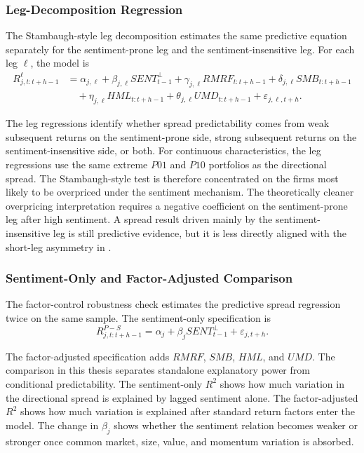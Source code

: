 \documentclass[11pt]{article}
\newcommand{\var}[1]{\ensuremath{#1}}
\begin{document}
\subsubsection{Leg-Decomposition Regression}
The Stambaugh-style leg decomposition estimates the same predictive equation separately for the sentiment-prone leg and the sentiment-insensitive leg. For each leg \var{\ell}, the model is
\begin{equation}
    \begin{aligned}
    R^{\ell}_{j,t:t+h-1}
    &=
    \alpha_{j,\ell}
    + \beta_{j,\ell} SENT^{\perp}_{t-1}
    + \gamma_{j,\ell} RMRF_{t:t+h-1}
    + \delta_{j,\ell} SMB_{t:t+h-1} \\
    &\quad
    + \eta_{j,\ell} HML_{t:t+h-1}
    + \theta_{j,\ell} UMD_{t:t+h-1}
    + \varepsilon_{j,\ell,t+h}.
    \end{aligned}
\end{equation}

The leg regressions identify whether spread predictability comes from weak subsequent returns on the sentiment-prone side, strong subsequent returns on the sentiment-insensitive side, or both. For continuous characteristics, the leg regressions use the same extreme \var{P01} and \var{P10} portfolios as the directional spread. The Stambaugh-style test is therefore concentrated on the firms most likely to be overpriced under the sentiment mechanism. The theoretically cleaner overpricing interpretation requires a negative coefficient on the sentiment-prone leg after high sentiment. A spread result driven mainly by the sentiment-insensitive leg is still predictive evidence, but it is less directly aligned with the short-leg asymmetry in \citet{stambaugh2012short}.

\subsubsection{Sentiment-Only and Factor-Adjusted Comparison}
The factor-control robustness check estimates the predictive spread regression twice on the same sample. The sentiment-only specification is
\begin{equation}
    R^{P-S}_{j,t:t+h-1}
    =
    \alpha_j
    + \beta_j SENT^{\perp}_{t-1}
    + \varepsilon_{j,t+h}.
\end{equation}

The factor-adjusted specification adds \var{RMRF}, \var{SMB}, \var{HML}, and \var{UMD}. The comparison in this thesis separates standalone explanatory power from conditional predictability. The sentiment-only \var{R^2} shows how much variation in the directional spread is explained by lagged sentiment alone. The factor-adjusted \var{R^2} shows how much variation is explained after standard return factors enter the model. The change in \var{\beta_j} shows whether the sentiment relation becomes weaker or stronger once common market, size, value, and momentum variation is absorbed.
\end{document}
